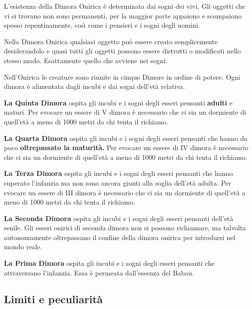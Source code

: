 L'esistenza della Dimora Onirica \`e determinata dai
sogni dei vivi. Gli oggetti che vi si trovano non sono permanenti, per
la maggior parte appaiono e scompaiono spesso repentinamente,
cos\`{\i} come i pensieri e i sogni degli uomini. 

Nella Dimora Onirica
qualsiasi oggetto pu\`o essere creato semplicemente desiderandolo e
quasi tutti gli oggetti possono essere distrutti o modificati nello
stesso modo. Esattamente quello che avviene nei sogni. 

Nell'Onirica le creature sono riunite in cinque Dimore in ordine di
potere. Ogni dimora \`e alimentata dagli incubi e dai sogni
dell'et\`a relativa. 

\begin{description} 
\item{\bf La Quinta Dimora} ospita gli incubi e i sogni degli esseri
  pensanti \textbf{adulti} e maturi. Per evocare un essere di V dimora
  \`e necessario che ci sia un dormiente di quell'et\`a a meno di
  1000 metri da chi tenta il richiamo.
  
\item{\bf La Quarta Dimora} ospita gli incubi e i sogni degli esseri
  pensanti che hanno da poco\textbf{ oltrepassato la maturit\`a.}
  Per evocare un essere di IV dimora \`e necessario che ci sia un
  dormiente di quell'et\`a a meno di 1000 metri da chi tenta il
  richiamo.
  
\item{\bf La Terza Dimora} ospita gli incubi e i sogni degli esseri
  pensanti che hanno superato l'infanzia ma non sono ancora giunti
  alla soglia dell'et\`a adulta. Per evocare un essere di III dimora \`e
  necessario che ci sia un dormiente di quell'et\`a a meno di 1000
  metri da chi tenta il richiamo.
  
\item{\bf La Seconda Dimora} ospita gli incubi e i sogni degli esseri
  pensanti dell'et\`a senile. Gli esseri onirici di seconda dimora
  non si possono richiamare, ma talvolta autonomamente oltrepassano il
  confine della dimora onirica per introdursi nel mondo reale.
  
\item{\bf La Prima Dimora} ospita gli incubi e i sogni degli esseri
  pensanti che attraversano l'infanzia. Essa \`e permeata
  dall'essenza del Babau.
\end{description}

\subsection{Limiti e peculiarit\`a}

